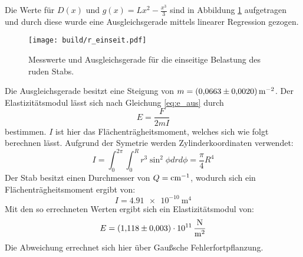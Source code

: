 \noindent Die Werte für $D(x)$ und $g(x)=Lx^2-\frac{x^3}{3}$ sind in Abbildung \ref{fig:plot1} 
aufgetragen und durch diese wurde eine Ausgleichsgerade mittels linearer Regression gezogen.
\begin{figure}
    \centering
    \texttt{[image: build/r\_einseit.pdf]}
    \caption{Messwerte und Ausgleichsgerade für die einseitige Belastung des ruden Stabs.}
    \label{fig:plot1}
\end{figure}
%
\noindent Die Ausgleichsgerade besitzt eine Steigung von $m=\SI[per-mode=reciprocal]{0.0663\pm 
0.002}{\per\meter\squared}$.
Der Elastizitätsmodul lässt sich nach Gleichung \eqref{eq:e_aus} durch
\begin{equation}
  E=\frac{F}{2mI}
\end{equation}
bestimmen.
$I$ ist hier das Flächenträgheitsmoment, welches sich wie folgt berechnen lässt.
Aufgrund der Symetrie werden Zylinderkoordinaten verwendet:
\begin{equation}
  I=\int_0^{2\pi} \int_0^R r^3 \sin^2{\phi} dr d\phi=\frac{\pi}{4}R^4
\end{equation}
Der Stab besitzt einen Durchmesser von $Q=\si[per-mode=reciprocal]{\per\centi\meter}$, wodurch 
sich ein Flächenträgheitsmoment ergibt von:
\begin{equation*}
  I=\SI{4.91e-10}{\meter\tothe{4}}
\end{equation*}
Mit den so errechneten Werten ergibt sich ein Elastizitätsmodul von:
\begin{equation*}
  E=\SI{1.118\pm0.003e11}{\newton\per\meter\squared}
\end{equation*}
Die Abweichung errechnet sich hier über Gaußsche Fehlerfortpflanzung.
%
